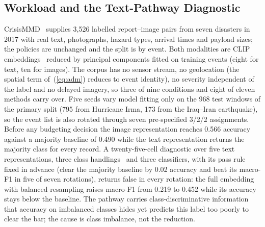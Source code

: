 \subsection{Workload and the Text-Pathway Diagnostic}
\label{sec:repr}
CrisisMMD~\cite{crisismmd} supplies 3,526 labelled report--image pairs from seven disasters in 2017 with real text, photographs, hazard types, arrival times and payload sizes; the policies are unchanged and the split is by event. Both modalities are CLIP embeddings~\cite{clip} reduced by principal components fitted on training events (eight for text, ten for images). The corpus has no sensor stream, no geolocation (the spatial term of~(\ref{eq:adm}) reduces to event identity), no severity independent of the label and no delayed imagery, so three of nine conditions and eight of eleven methods carry over. Five seeds vary model fitting only on the 968 test windows of the primary split (795 from Hurricane Irma, 173 from the Iraq--Iran earthquake), so the event list is also rotated through seven pre-specified 3/2/2 assignments. Before any budgeting decision the image representation reaches 0.566 accuracy against a majority baseline of 0.490 while the text representation returns the majority class for every record. A twenty-five-cell diagnostic over five text representations, three class handlings~\cite{imbalance} and three classifiers, with its pass rule fixed in advance (clear the majority baseline by 0.02 accuracy and beat its macro-F1 in five of seven rotations), returns false in every rotation: the full embedding with balanced resampling raises macro-F1 from 0.219 to 0.452 while its accuracy stays below the baseline. The pathway carries class-discriminative information that accuracy on imbalanced classes hides yet predicts this label too poorly to clear the bar; the cause is class imbalance, not the reduction.

\tablereal

